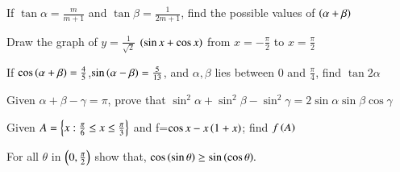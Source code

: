 \iffalse
  \title{Assignment-1}
  \author{ee24btech11004-ANKIT JAINAR}
  \section{subjective}
\fi




\item If $\tan{\alpha}=\frac{m}{m+1}$ and $\tan{\beta}=\frac{1}{2m+1}$, find the possible values of $\left(\alpha+\beta\right)$ \hfill{}
    \item Draw the graph of $y=\frac{1}{\sqrt{2}}$ $\left(\sin {x}+\cos {x}\right)$ from $x=-\frac{\pi}{2}$ to $x=\frac{\pi}{2}$
    \item If $\cos{\ensuremath{\left(\alpha+\beta\right)}}=\frac{4}{5}$,$\sin{\ensuremath{\left(\alpha-\beta\right)}}=\frac{5}{13}$, and $\alpha,\beta$ lies between $0$ and $\frac{\pi}{4}$, find $\tan{2\alpha}$ \hfill{}
\item Given $\alpha+\beta-\gamma=\pi$, prove that $\sin^2{\alpha}+\sin^2{\beta}-\sin^2{\gamma}=2\sin{\alpha}\sin{\beta}\cos{\gamma}$ \hfill{}
\item Given $A=\left\{x:\frac{\pi}{6}\le x\le\frac{\pi}{3}\right\}$ and f=$\cos{x-x\ensuremath{\left(1+x\right)}}$; find $f\left(A\right)$ \hfill{}

\item For all $\theta$ in $\left(0, \frac{\pi}{2}\right)$ show that, $\cos\left(\sin\theta\right)\geq
\sin{\ensuremath{\left(\cos{\theta}\right)}}.$ \hfill{}



